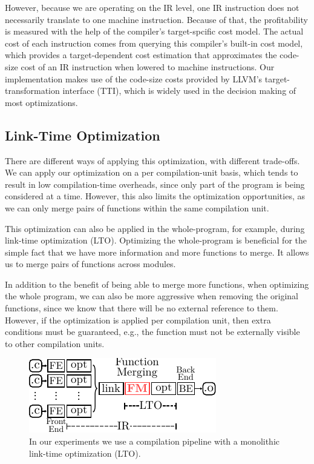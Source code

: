 However, because we are operating on the IR level, one IR instruction does not
necessarily translate to one machine instruction.
Because of that, the profitability is measured with the help of the compiler's
target-spcific cost model.
The actual cost of each instruction comes from querying this compiler's built-in
cost model, which provides a target-dependent cost estimation that approximates
the code-size cost of an IR instruction when lowered to machine instructions.
Our implementation makes use of the code-size costs provided by LLVM's
target-transformation interface (TTI), which is widely used in the decision
making of most optimizations.

\subsection{Link-Time Optimization}

There are different ways of applying this optimization, with different trade-offs.
We can apply our optimization on a per compilation-unit basis, which tends to
result in low compilation-time overheads, since only part of the program is being
considered at a time.
However, this also limits the optimization opportunities, as we can only merge
pairs of functions within the same compilation unit.

This optimization can also be applied in the whole-program, for example, during
link-time optimization (LTO).
Optimizing the whole-program is beneficial for the simple fact that we have more
information and more functions to merge.
It allows us to merge pairs of functions across modules.

In addition to the benefit of being able to merge more functions, when optimizing
the whole program, we can also be more aggressive when removing the original functions,
since we know that there will be no external reference to them.
However, if the optimization is applied per compilation unit, then extra
conditions must be guaranteed, e.g., the function must not be externally visible
to other compilation units.

\begin{figure}[b]
  \centering
  \includegraphics[width=0.7\linewidth]{figs/opt-pipeline.pdf}
  \caption{In our experiments we use a compilation pipeline with a monolithic link-time optimization (LTO).}
  \label{fig:opt-pipeline}
\end{figure}


